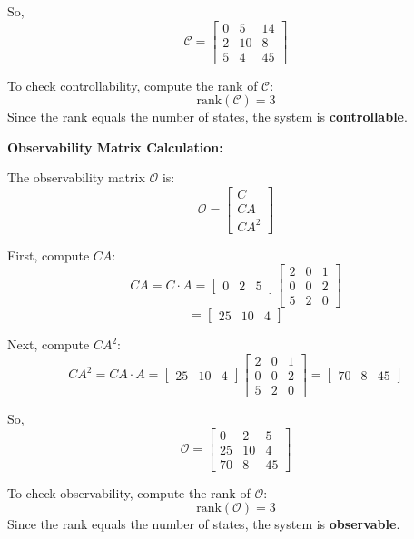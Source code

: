 So,
\[
    \mathcal{C} = \begin{bmatrix}
        0 & 5  & 14 \\
        2 & 10 & 8  \\
        5 & 4  & 45
    \end{bmatrix}
\]

To check controllability, compute the rank of $\mathcal{C}$:
\[
    \text{rank}(\mathcal{C}) = 3
\]
Since the rank equals the number of states, the system is \textbf{controllable}.

\vspace{1em}
\textbf{Observability Matrix Calculation:}

The observability matrix $\mathcal{O}$ is:
\[
    \mathcal{O} = \begin{bmatrix} C \\ CA \\ CA^2 \end{bmatrix}
\]

First, compute $CA$:
\[
    CA = C \cdot A =
    \begin{bmatrix} 0 & 2 & 5 \end{bmatrix}
    \begin{bmatrix}
        2 & 0 & 1 \\
        0 & 0 & 2 \\
        5 & 2 & 0
    \end{bmatrix}
\]
\[
    = \begin{bmatrix} 25 & 10 & 4 \end{bmatrix}
\]

Next, compute $CA^2$:
\[
    CA^2 = CA \cdot A =
    \begin{bmatrix}
        25 & 10 & 4
    \end{bmatrix}
    \begin{bmatrix}
        2 & 0 & 1 \\
        0 & 0 & 2 \\
        5 & 2 & 0
    \end{bmatrix}
    =
    \begin{bmatrix}
        70 & 8 & 45
    \end{bmatrix}
\]

So,
\[
    \mathcal{O} = \begin{bmatrix}
        0  & 2  & 5  \\
        25 & 10 & 4  \\
        70 & 8  & 45
    \end{bmatrix}
\]

To check observability, compute the rank of $\mathcal{O}$:
\[
    \text{rank}(\mathcal{O}) = 3
\]
Since the rank equals the number of states, the system is \textbf{observable}.